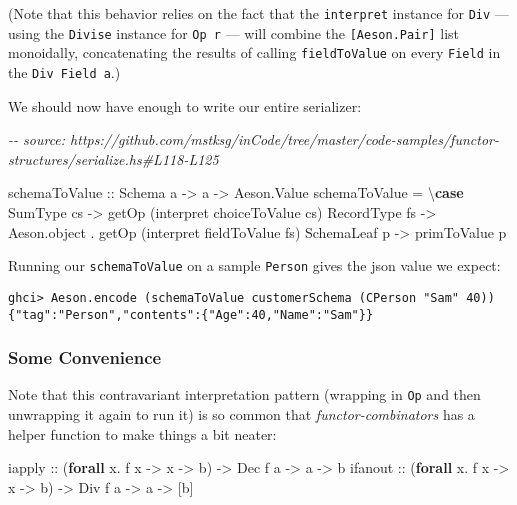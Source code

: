 \documentclass[]{article}
\newenvironment{Shaded}{}{}
\newcommand{\CommentTok}[1]{\textcolor[rgb]{0.38,0.63,0.69}{\textit{#1}}}
\newcommand{\DataTypeTok}[1]{\textcolor[rgb]{0.56,0.13,0.00}{#1}}
\newcommand{\KeywordTok}[1]{\textcolor[rgb]{0.00,0.44,0.13}{\textbf{#1}}}
\newcommand{\NormalTok}[1]{#1}
\newcommand{\OperatorTok}[1]{\textcolor[rgb]{0.40,0.40,0.40}{#1}}
\newcommand{\OtherTok}[1]{\textcolor[rgb]{0.00,0.44,0.13}{#1}}
\begin{document}
(Note that this behavior relies on the fact that the \texttt{interpret} instance
for \texttt{Div} --- using the \texttt{Divise} instance for \texttt{Op\ r} ---
will combine the \texttt{{[}Aeson.Pair{]}} list monoidally, concatenating the
results of calling \texttt{fieldToValue} on every \texttt{Field} in the
\texttt{Div\ Field\ a}.)

We should now have enough to write our entire serializer:

\begin{Shaded}
\begin{Highlighting}[]
\CommentTok{{-}{-} source: https://github.com/mstksg/inCode/tree/master/code{-}samples/functor{-}structures/serialize.hs\#L118{-}L125}

\NormalTok{schemaToValue}
\OtherTok{    ::} \DataTypeTok{Schema}\NormalTok{ a}
    \OtherTok{{-}>}\NormalTok{ a}
    \OtherTok{{-}>} \DataTypeTok{Aeson.Value}
\NormalTok{schemaToValue }\OtherTok{=}\NormalTok{ \textbackslash{}}\KeywordTok{case}
    \DataTypeTok{SumType}\NormalTok{    cs }\OtherTok{{-}>}\NormalTok{ getOp (interpret choiceToValue cs)}
    \DataTypeTok{RecordType}\NormalTok{ fs }\OtherTok{{-}>}\NormalTok{ Aeson.object }\OperatorTok{.}\NormalTok{ getOp (interpret fieldToValue fs)}
    \DataTypeTok{SchemaLeaf}\NormalTok{ p  }\OtherTok{{-}>}\NormalTok{ primToValue p}
\end{Highlighting}
\end{Shaded}

Running our \texttt{schemaToValue} on a sample \texttt{Person} gives the json
value we expect:

\begin{verbatim}
ghci> Aeson.encode (schemaToValue customerSchema (CPerson "Sam" 40))
{"tag":"Person","contents":{"Age":40,"Name":"Sam"}}
\end{verbatim}

\hypertarget{some-convenience}{%
\subsubsection{Some Convenience}\label{some-convenience}}

Note that this contravariant interpretation pattern (wrapping in \texttt{Op} and
then unwrapping it again to run it) is so common that \emph{functor-combinators}
has a helper function to make things a bit neater:

\begin{Shaded}
\begin{Highlighting}[]
\OtherTok{iapply  ::}\NormalTok{ (}\KeywordTok{forall}\NormalTok{ x}\OperatorTok{.}\NormalTok{ f x }\OtherTok{{-}>}\NormalTok{ x }\OtherTok{{-}>}\NormalTok{ b) }\OtherTok{{-}>} \DataTypeTok{Dec}\NormalTok{ f a }\OtherTok{{-}>}\NormalTok{ a }\OtherTok{{-}>}\NormalTok{ b}
\OtherTok{ifanout ::}\NormalTok{ (}\KeywordTok{forall}\NormalTok{ x}\OperatorTok{.}\NormalTok{ f x }\OtherTok{{-}>}\NormalTok{ x }\OtherTok{{-}>}\NormalTok{ b) }\OtherTok{{-}>} \DataTypeTok{Div}\NormalTok{ f a }\OtherTok{{-}>}\NormalTok{ a }\OtherTok{{-}>}\NormalTok{ [b]}
\end{Highlighting}
\end{Shaded}
\end{document}
